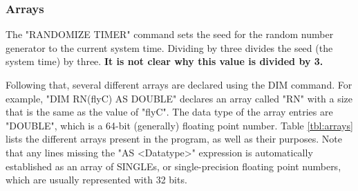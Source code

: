 \documentclass[10pt, reqno]{exam}
\begin{document}
\subsubsection{Arrays}

The "RANDOMIZE TIMER" command sets the seed for the random number generator to the current system time. Dividing by three divides the seed (the system time) by three. \textbf{It is not clear why this value is divided by 3.} \par

Following that, several different arrays are declared using the DIM command. For example, "DIM RN(flyC) AS DOUBLE" declares an array called "RN" with a size that is the same as the value of "flyC". The data type of the array entries are "DOUBLE", which is a 64-bit (generally) floating point number. Table \ref{tbl:arrays} lists the different arrays present in the program, as well as their purposes. Note that any lines missing the "AS <Datatype>" expression is automatically established as an array of SINGLEs, or single-precision floating point numbers, which are usually represented with 32 bits. \par
\end{document}
